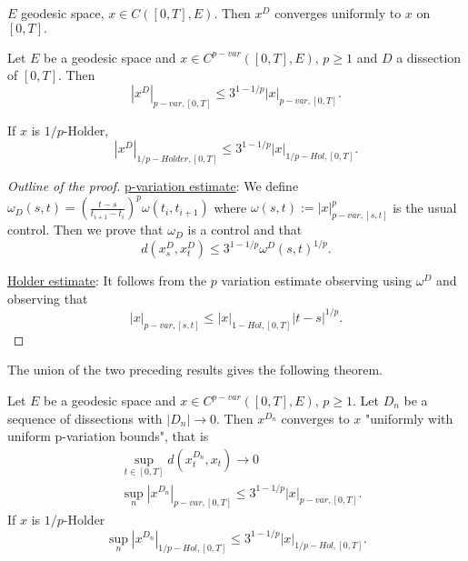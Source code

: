 \begin{lemma}
    $E$ geodesic space, $x \in C([0,T],E).$ Then $x^D$ converges uniformly to $x$ on $[0,T].$
\end{lemma}

\begin{proposition}
    Let $E$ be a geodesic space and $x \in C^{p-var}([0,T], E)$, $p \ge 1$ and $D$ a dissection of $[0,T]$. Then
    \begin{equation}
        |x^D|_{p-var,[0,T]} \le 3^{1-1/p} |x|_{p-var, [0,T]}.
    \end{equation}

    If $x$ is $1/p$-Holder,
    \begin{equation}
        |x^D|_{1/p-Holder,[0,T]} \le 3^{1-1/p} |x|_{1/p-Hol, [0,T]}.
    \end{equation}
\end{proposition}
\begin{proof}[Outline of the proof]
    \underline{p-variation estimate}:
    We define $\omega_D(s,t) = \left( \frac{t - s}{t_{i+1} - t_i} \right)^p \omega(t_i, t_{i+1})$ where $\omega(s,t) := |x|_{p-var,[s,t]}^p$ is the usual control.
    Then we prove that $\omega_D$ is a control and that 
    \begin{equation}
        d(x_s^D, x_t^D) \le 3^{1 - 1/p} \omega^D(s,t)^{1/p}.
    \end{equation}

    \underline{Holder estimate}:
    It follows from the $p$ variation estimate observing using $\omega^D$ and observing that 
    \begin{equation}
        |x|_{p-var,[s,t]} \le |x|_{1-Hol,[0,T]} |t - s|^{1/p}.
    \end{equation}
\end{proof}

The union of the two preceding results gives the following theorem.

\begin{theorem}
    Let $E$ be a geodesic space and $x \in C^{p-var}([0,T],E)$, $p \ge 1$. Let $D_n$ be a sequence of dissections with $|D_n| \rightarrow 0$.
    Then $x^{D_n}$ converges to $x$ "uniformly with uniform p-variation bounds", that is
    \begin{align}
        &\sup_{t \in [0,T]} d \left( x_t^{D_n}, x_t \right) \rightarrow 0 \\
        &\sup_n |x^{D_n}|_{p-var, [0,T]} \le 3^{1 - 1/p} |x|_{p-var, [0,T]}.
    \end{align}
    If $x$ is $1/p$-Holder
    \begin{equation}
        \sup_n |x^{D_n}|_{1/p-Hol, [0,T]} \le 3^{1 - 1/p} |x|_{1/p-Hol, [0,T]}.
    \end{equation}
\end{theorem}

